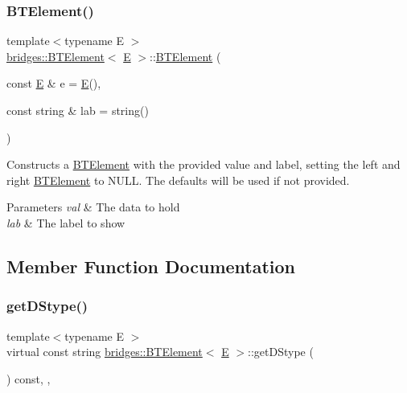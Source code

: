 \subsubsection{\texorpdfstring{BTElement()}{BTElement()}\hspace{0.1cm}{\footnotesize\ttfamily [2/2]}}
{\footnotesize\ttfamily template$<$typename E $>$ \\
\mbox{\hyperlink{classbridges_1_1_b_t_element}{bridges\+::\+B\+T\+Element}}$<$ \mbox{\hyperlink{namespacebridges_acfb0a4f7877d8f63de3e6862004c50eda3a3ea00cfc35332cedf6e5e9a32e94da}{E}} $>$\+::\mbox{\hyperlink{classbridges_1_1_b_t_element}{B\+T\+Element}} (\begin{DoxyParamCaption}\item[{const \mbox{\hyperlink{namespacebridges_acfb0a4f7877d8f63de3e6862004c50eda3a3ea00cfc35332cedf6e5e9a32e94da}{E}} \&}]{e = {\ttfamily \mbox{\hyperlink{namespacebridges_acfb0a4f7877d8f63de3e6862004c50eda3a3ea00cfc35332cedf6e5e9a32e94da}{E}}()},  }\item[{const string \&}]{lab = {\ttfamily string()} }\end{DoxyParamCaption})\hspace{0.3cm}{\ttfamily [inline]}}

Constructs a \mbox{\hyperlink{classbridges_1_1_b_t_element}{B\+T\+Element}} with the provided value and label, setting the left and right \mbox{\hyperlink{classbridges_1_1_b_t_element}{B\+T\+Element}} to N\+U\+LL. The defaults will be used if not provided.


\begin{DoxyParams}{Parameters}
{\em val} & The data to hold \\
\hline
{\em lab} & The label to show \\
\hline
\end{DoxyParams}


\subsection{Member Function Documentation}
\mbox{\label{classbridges_1_1_b_t_element_a43cc18d2c1e71c399782a306b60e4260}} 
\subsubsection{\texorpdfstring{getDStype()}{getDStype()}}
{\footnotesize\ttfamily template$<$typename E $>$ \\
virtual const string \mbox{\hyperlink{classbridges_1_1_b_t_element}{bridges\+::\+B\+T\+Element}}$<$ \mbox{\hyperlink{namespacebridges_acfb0a4f7877d8f63de3e6862004c50eda3a3ea00cfc35332cedf6e5e9a32e94da}{E}} $>$\+::get\+D\+Stype (\begin{DoxyParamCaption}{ }\end{DoxyParamCaption}) const\hspace{0.3cm}{\ttfamily [inline]}, {\ttfamily [override]}, {\ttfamily [virtual]}}

